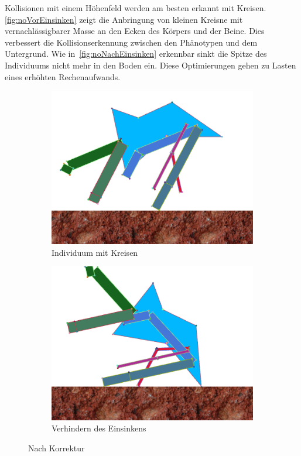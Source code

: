         Kollisionen mit einem Höhenfeld werden am besten erkannt mit Kreisen.
        \vref{fig:noVorEinsinken} zeigt die Anbringung von kleinen Kreisne mit vernachlässigbarer Masse an den Ecken des Körpers und der Beine.
        Dies verbessert die Kollisionserkennung zwischen den Phänotypen und dem Untergrund.
        Wie in~\vref{fig:noNachEinsinken} erkennbar sinkt die Spitze des Individuums nicht mehr in den Boden ein.
        Diese Optimierungen gehen zu Lasten eines erhöhten Rechenaufwands.

        \begin{figure}[H]
          \centering
          \begin{subfigure}[b]{0.45\textwidth}
            \includegraphics[width=\linewidth,center]{graphics/physics-engine/sink-fix-0}
            \caption{Individuum mit Kreisen\label{fig:noVorEinsinken}}
          \end{subfigure}
          \qquad
          \begin{subfigure}[b]{0.45\textwidth}
            \includegraphics[width=\linewidth,center]{graphics/physics-engine/sink-fix-1}
            \caption{Verhindern des Einsinkens\label{fig:noNachEinsinken}}
          \end{subfigure}
          \caption{Nach Korrektur}
        \end{figure}

